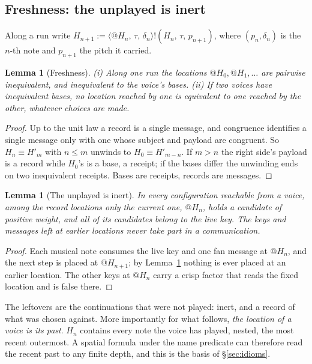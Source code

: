 \documentclass[11pt,a4paper]{article}
\makeatletter
\theoremstyle{plain}
\newtheorem{lemma}[theorem]{Lemma}
\theoremstyle{definition}
\theoremstyle{remark}
\newcommand{\scong}{\equiv}
\newcommand{\nm}[3]{\langle @#1,\,#2,\,#3\rangle}
\newcommand{\snd}[4]{#1!(#2,\,#3,\,#4)}
\makeatother
\begin{document}
\subsection{Freshness: the unplayed is inert}

Along a run write $H_{n+1} := \snd{\nm{H_n}{\tau}{\delta_n}}{H_n}{\tau}{p_{n+1}}$,
where $(p_n,\delta_n)$ is the $n$-th note and $p_{n+1}$ the pitch it carried.

\begin{lemma}[Freshness]\label{lem:fresh}
(i) Along one run the locations $@H_0, @H_1,\dots$ are pairwise inequivalent,
and inequivalent to the voice's bases. (ii) If two voices have inequivalent
bases, no location reached by one is equivalent to one reached by the other,
whatever choices are made.
\end{lemma}
\begin{proof}
Up to the unit law a record is a single message, and congruence identifies a
single message only with one whose subject and payload are congruent. So
$H_n \scong H'_m$ with $n \le m$ unwinds to $H_0 \scong H'_{m-n}$. If $m>n$ the
right side's payload is a record while $H_0$'s is a base, a receipt; if the
bases differ the unwinding ends on two inequivalent receipts. Bases are
receipts, records are messages.
\end{proof}

\begin{lemma}[The unplayed is inert]\label{lem:inert}
In every configuration reachable from a voice, among the record locations only
the current one, $@H_n$, holds a candidate of positive weight, and all of its
candidates belong to the live key. The keys and messages left at earlier
locations never take part in a communication.
\end{lemma}
\begin{proof}
Each musical note consumes the live key and one fan message at $@H_n$, and the
next step is placed at $@H_{n+1}$; by Lemma~\ref{lem:fresh} nothing is ever
placed at an earlier location. The other keys at $@H_n$ carry a crisp factor
that reads the fixed location and is false there.
\end{proof}

The leftovers are the continuations that were not played: inert, and a record
of what was chosen against. More importantly for what follows, \emph{the
location of a voice is its past}. $H_n$ contains every note the voice has
played, nested, the most recent outermost. A spatial formula under the name
predicate can therefore read the recent past to any finite depth, and this is
the basis of \S\ref{sec:idioms}.
\end{document}
